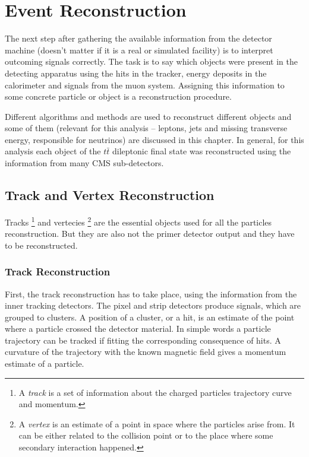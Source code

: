 \chapter{Event Reconstruction}\label{chapt:event_selection}
 
The next step after gathering the available information from the detector machine (doesn't matter if it is a real or simulated facility)
is to interpret outcoming signals correctly. The task is to say which objects were present in the detecting apparatus using the hits
in the tracker, energy deposits in the calorimeter and signals from the muon system. Assigning this information to some concrete particle 
or object is a reconstruction procedure.

Different algorithms and methods are used to reconstruct different objects and some of them (relevant for this analysis -- leptons, jets and missing transverse
energy, responsible for neutrinos) are discussed in this
chapter. In general, for this analysis each object of the $t\bar{t}$ dileptonic final state was reconstructed using the information from many
CMS sub-detectors.

\section{Track and Vertex Reconstruction}

Tracks \footnote{A \textit{track} is a set of information about the charged particles trajectory curve and momentum.} and vertecies 
\footnote{A \textit{vertex} is an estimate of a point in space where the particles arise from. It can be either related to the 
collision point or to the place  where some secondary interaction happened.} are the essential objects used for all the particles reconstruction. 
But they are also not the primer detector output and they have to be reconstructed.

\subsection{Track Reconstruction}

First, the track reconstruction has to take place, using the information from the inner tracking detectors. The pixel and strip detectors 
produce signals, which are grouped to clusters. A position of a cluster, or a hit, is an estimate of the point where a particle crossed the
detector material. In simple words a particle trajectory can be tracked if fitting the corresponding consequence of hits. A curvature 
of the trajectory with the known magnetic field gives a momentum estimate of a particle.

